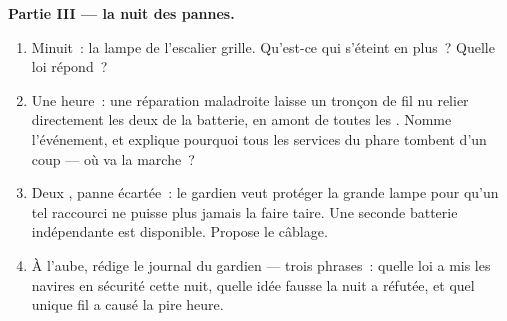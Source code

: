 \begin{problem}
\medskip\noindent\textbf{Partie III --- la nuit des pannes.}
\begin{enumerate}[resume]
  \item Minuit~: la lampe de l'escalier grille. Qu'est-ce qui
        s'éteint en plus~? Quelle loi répond~?
  \item Une heure~: une réparation maladroite laisse un tronçon de
        fil nu relier directement les deux  de la batterie, en
        amont de toutes les . Nomme l'événement, et explique
        pourquoi tous les services du phare tombent d'un coup ---
        où va la marche~?
  \item Deux , panne écartée~: le gardien veut protéger la
        grande lampe pour qu'un tel raccourci ne puisse plus jamais
        la faire taire. Une seconde batterie indépendante est
        disponible. Propose le câblage.
  \item À l'aube, rédige le journal du gardien --- trois phrases~:
        quelle loi a mis les navires en sécurité cette nuit, quelle
        idée fausse la nuit a réfutée, et quel unique fil a causé la
        pire heure.
\end{enumerate}
\end{problem}
